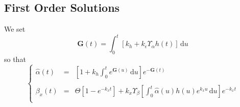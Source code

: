 \documentclass[aps,onecolumn,12pt]{revtex4}
\newcommand{\ig}{\ensuremath{\mathbf{G}}}
\begin{document}
\subsection{First Order Solutions}
We set
\begin{equation}
	\ig(t) = \int_0^{t} \left[ k_h + k_\epsilon \Upsilon_\alpha h(t) \right] \,\mathrm{d}u
\end{equation}
so that
\begin{equation}
\left\lbrace
\begin{array}{rcl}
	\hat\alpha(t) & = & \displaystyle \left[1+ k_h\int_0^t e^{\ig(u)}\,\mathrm{d} u\right] e^{-\ig(t)} \\
	\\
	\beta_x(t)    & = & \displaystyle \Theta \left[ 1-e^{-k_x t} \right] + k_x \Upsilon_\beta \left[ \int_0^t  \hat\alpha(u) h(u) e^{k_x u} \,\mathrm{d} u\right] e^{-k_xt}\\
\end{array}
\right.
\end{equation}
\end{document}
